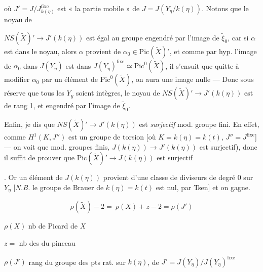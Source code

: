 \documentclass[11pt,a4paper]{article}
\begin{document}

où $J' = J / J^{\mathrm{fixe}}_{k(\eta)}$ est « la partie mobile » de
$J = J(Y_\eta / k(\eta))$. Notons que le noyau de

$NS(\tilde{X})' \to J'(k(\eta))$ est égal au groupe engendré par l'image
de $\tilde{\xi}_0$, car si $\alpha$ est dans le noyau, alors $\alpha$
provient de $\alpha_0 \in \mathrm{Pic}(\tilde{X})'$, et comme par hyp.
l'image de $\alpha_0$ dans $J(Y_\eta)$ est dans
$J(Y_\eta)^{\mathrm{fixe}} \simeq \mathrm{Pic}^{0}(\tilde{X})$, il
s'ensuit que quitte à modifier $\alpha_0$ par un élément de
$\mathrm{Pic}^{0}(\tilde{X})$, on aura une image nulle --- Donc sous
réserve que tous les $Y_y$ soient intègres, le noyau de
$NS(\tilde{X})' \to J'(k(\eta))$ est de rang 1, et engendré par l'image
de $\tilde{\xi}_0$.

Enfin, je dis que  $NS(\tilde{X})' \to J'(k(\eta))$ est
\emph{surjectif} mod. groupe fini. En effet, 
 comme $H^{1}(K, J'')$ est un groupe de torsion
[où $K = k(\eta) = k(t)$, $J'' = J^{\mathrm{fixe}}$] --- on voit que mod.
groupes finis, 
$J(k(\eta)) \to J'(k(\eta))$ est surjectif), donc il suffit de prouver que
$\mathrm{Pic}(\tilde{X})' \to J(k(\eta))$ est surjectif 

. Or un élément de $J(k(\eta))$
 provient \struck{\ill{}}  d'une classe
de diviseurs de degré 0 sur $Y_\eta$ [\emph{N.B.} le groupe de Brauer de
$k(\eta) = k(t)$ est nul, par Tsen] et on gagne.

\[
  \boxed{\rho(\tilde{X}) - 2 =}\ \boxed{\rho(X) + z - 2 = \rho(J')}
\]

$\rho(X)$ nb de Picard de $X$

$z =$ nb des  du pinceau

$\rho(J')$ \struck{=} rang du groupe des pts rat. sur $k(\eta)$, de
$J' = J(Y_\eta) / J(Y_\eta)^{\mathrm{fixe}}$
\end{document}

